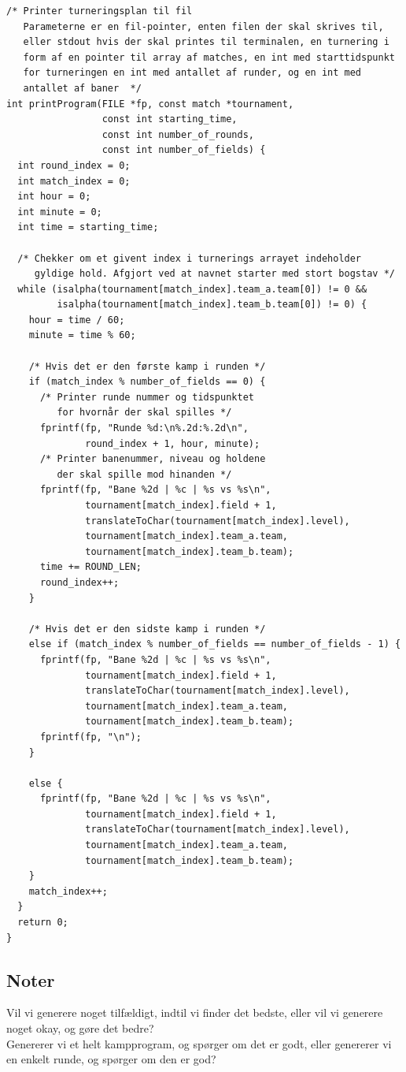  \begin{listing}
\begin{verbatim}
/* Printer turneringsplan til fil
   Parameterne er en fil-pointer, enten filen der skal skrives til, 
   eller stdout hvis der skal printes til terminalen, en turnering i 
   form af en pointer til array af matches, en int med starttidspunkt 
   for turneringen en int med antallet af runder, og en int med 
   antallet af baner  */
int printProgram(FILE *fp, const match *tournament, 
                 const int starting_time, 
                 const int number_of_rounds,
                 const int number_of_fields) {
  int round_index = 0;
  int match_index = 0;
  int hour = 0;
  int minute = 0;
  int time = starting_time;

  /* Chekker om et givent index i turnerings arrayet indeholder 
     gyldige hold. Afgjort ved at navnet starter med stort bogstav */
  while (isalpha(tournament[match_index].team_a.team[0]) != 0 &&
         isalpha(tournament[match_index].team_b.team[0]) != 0) {
    hour = time / 60;
    minute = time % 60;

    /* Hvis det er den første kamp i runden */
    if (match_index % number_of_fields == 0) {
      /* Printer runde nummer og tidspunktet 
         for hvornår der skal spilles */
      fprintf(fp, "Runde %d:\n%.2d:%.2d\n",
              round_index + 1, hour, minute);
      /* Printer banenummer, niveau og holdene
         der skal spille mod hinanden */
      fprintf(fp, "Bane %2d | %c | %s vs %s\n",
              tournament[match_index].field + 1, 
              translateToChar(tournament[match_index].level),
              tournament[match_index].team_a.team, 
              tournament[match_index].team_b.team);
      time += ROUND_LEN;
      round_index++;
    }

    /* Hvis det er den sidste kamp i runden */
    else if (match_index % number_of_fields == number_of_fields - 1) {
      fprintf(fp, "Bane %2d | %c | %s vs %s\n",
              tournament[match_index].field + 1,
              translateToChar(tournament[match_index].level),
              tournament[match_index].team_a.team, 
              tournament[match_index].team_b.team);
      fprintf(fp, "\n");
    }

    else {
      fprintf(fp, "Bane %2d | %c | %s vs %s\n",
              tournament[match_index].field + 1, 
              translateToChar(tournament[match_index].level),
              tournament[match_index].team_a.team,
              tournament[match_index].team_b.team);
    }
    match_index++;
  }
  return 0;
}
\end{verbatim}
\label{code:printProgram}
\end{listing}






\subsection*{Noter}
Vil vi generere noget tilfældigt, indtil vi finder det bedste, eller vil vi generere noget okay, og gøre det bedre?\\
Genererer vi et helt kampprogram, og spørger om det er godt, eller genererer vi en enkelt runde, og spørger om den er god?